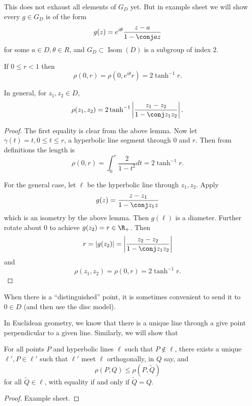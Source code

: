 \documentclass[a4paper]{article}
\theoremstyle{definition}
\DeclareMathOperator{\Isom}{Isom}
\begin{document}
This does not exhaust all elements of \(G_D\) yet. But in example sheet we will show every \(g \in G_D\) is of the form
\[
  g(z) = e^{i\theta} \frac{z - a}{1 - \conj a z}
\]
for some \(a \in D, \theta \in R\), and \(G_D \subset \Isom(D)\) is a subgroup of index \(2\).

\begin{proposition}
  If \(0 \leq r < 1\) then
  \[
    \rho(0, r) = \rho(0, e^{i\theta}r) = 2 \tanh^{-1} r.
  \]

  In general, for \(z_1, z_2 \in D\),
  \[
    \rho(z_1, z_2) = 2 \tanh^{-1} \left| \frac{z_1 - z_2}{1 - \conj z_1 z_2} \right|.
  \]
\end{proposition}

\begin{proof}
  The first equality is clear from the above lemma. Now let \(\gamma(t) = t, 0 \leq t \leq r\), a hyperbolic line segment through \(0\) and \(r\). Then from definitions the length is
  \[
    \rho(0, r) = \int_0^r \frac{2}{1 - t^2} dt = 2 \tanh^{-1} r.
  \]

  For the general case, let \(\ell\) be the hyperbolic line through \(z_1, z_2\). Apply
  \[
    g(z) = \frac{z - z_1}{1 - \conj z_1 z}
  \]
  which is an isometry by the above lemma. Then \(g(\ell)\) is a diameter. Further rotate about \(0\) to achieve \(g(z_2) = r \in \R_+\). Then
  \[
    r = |g(z_2)| = \left| \frac{z_2 - z_2}{1 - \conj z_1 z_2} \right|
  \]
  and
  \[
    \rho(z_1, z_2) = \rho(0, r) = 2 \tanh^{-1} r.
  \]
\end{proof}

\begin{remark}
  When there is a ``distinguished'' point, it is sometimes convenient to send it to \(0 \in D\) (and then use the disc model).
\end{remark}

In Euclidean geometry, we know that there is a unique line through a give point perpendicular to a given line. Similarly, we will show that

\begin{proposition}
  For all points \(P\) and hyperbolic lines \(\ell\) such that \(P \notin \ell\), there exists a unique \(\ell', P \in \ell'\) such that \(\ell'\) meet \(\ell\) orthogonally, in \(Q\) say, and
  \[
    \rho(P, Q) \leq \rho(P, \tilde Q)
  \]
  for all \(\tilde Q \in \ell\), with equality if and only if \(\tilde Q = Q\).
\end{proposition}

\begin{proof}
  Example sheet.
\end{proof}
\end{document}

